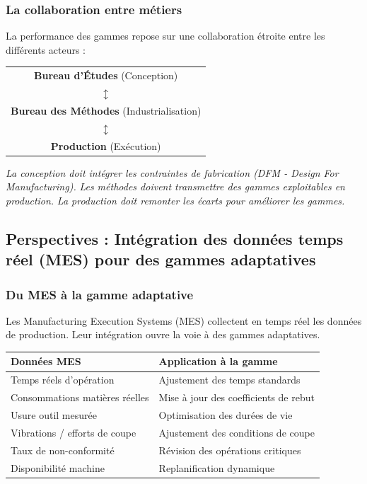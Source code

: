\documentclass{article}
\begin{document}
\begin{table}[h]
\subsubsection{La collaboration entre métiers}

La performance des gammes repose sur une collaboration étroite entre les différents acteurs :

\begin{tcolorbox}[colback=vertclair, colframe=green!50!black, title=Collaboration conception - méthodes - production]
\begin{center}
\begin{tabular}{c}
\textbf{Bureau d'Études} (Conception)\\
$\updownarrow$ \\
\textbf{Bureau des Méthodes} (Industrialisation)\\
$\updownarrow$ \\
\textbf{Production} (Exécution)
\end{tabular}
\end{center}
\vspace{0.5em}
\textit{La conception doit intégrer les contraintes de fabrication (DFM - Design For Manufacturing).}
\textit{Les méthodes doivent transmettre des gammes exploitables en production.}
\textit{La production doit remonter les écarts pour améliorer les gammes.}
\end{tcolorbox}

\subsection*{Perspectives : Intégration des données temps réel (MES) pour des gammes adaptatives}

\subsubsection{Du MES à la gamme adaptative}

Les Manufacturing Execution Systems (MES) collectent en temps réel les données de production. Leur intégration ouvre la voie à des gammes adaptatives.

\begin{table}[h]
\centering
\begin{tabular}{|p{}|p{}|}
\hline
\textbf{Données MES} & \textbf{Application à la gamme} \\
\hline
Temps réels d'opération & Ajustement des temps standards \\
Consommations matières réelles & Mise à jour des coefficients de rebut \\
Usure outil mesurée & Optimisation des durées de vie \\
Vibrations / efforts de coupe & Ajustement des conditions de coupe \\
Taux de non-conformité & Révision des opérations critiques \\
Disponibilité machine & Replanification dynamique \\
\hline
\end{tabular}
\end{table}


\end{table}
\end{document}
